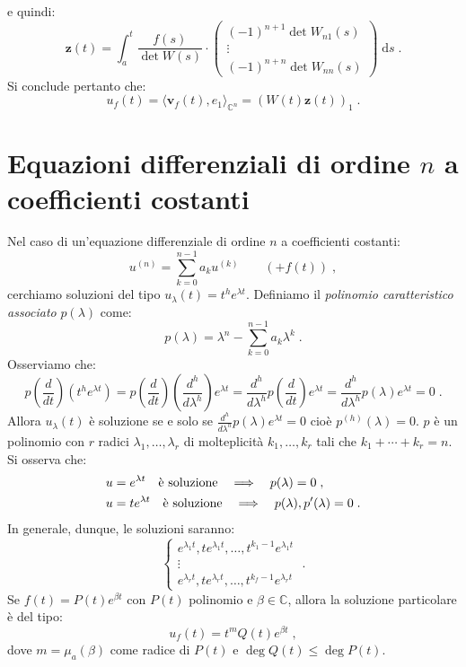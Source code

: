 \documentclass[a4paper,12pt]{report}
\theoremstyle{plain}
\theoremstyle{definition}
\theoremstyle{remark}
\newcommand{\diff}[1]{\mathrm{d}#1}
\numberwithin{equation}{section}
\begin{document}
e quindi:
\begin{equation}
\mathbf{z}(t)=\int_a^t{\frac{f(s)}{\det W(s)} \cdot \begin{pmatrix}
                                             (-1)^{n+1} \det W_{n1}(s) \\
\vdots \\
(-1)^{n+n} \det W_{nn}(s)
                                            \end{pmatrix}}\; \diff{s}\;.
\end{equation}
Si conclude pertanto che:
\begin{equation}
u_f(t)=\langle \mathbf{v}_f(t),e_1\rangle_{\mathbb{C}^n}=\left(W(t) \mathbf{z}(t)\right)_1\;.
\end{equation}
\section{Equazioni differenziali di ordine $n$ a coefficienti costanti}
Nel caso di un'equazione differenziale di ordine $n$ a coefficienti costanti:
\begin{equation}
u^{(n)}= \sum_{k=0}^{n-1} a_k u^{(k)} \qquad (+f(t))\;,
\end{equation}
cerchiamo soluzioni del tipo $u_{\lambda}(t)=t^h e^{\lambda t}$. Definiamo il \textit{polinomio caratteristico associato} $p(\lambda)$ come:
\begin{equation}
p(\lambda)=\lambda^n-\sum_{k=0}^{n-1}a_k \lambda^k\;.
\end{equation}
Osserviamo che:
\begin{equation}
p\left(\frac{d}{dt}\right)(t^h e^{\lambda t}) = p\left(\frac{d}{dt}\right)\left(\frac{d^h}{d\lambda^h}\right) e^{\lambda t} =
\frac{d^h}{d\lambda^h}p\left(\frac{d}{dt}\right) e^{\lambda t} = \frac{d^h}{d\lambda^h}p(\lambda)e^{\lambda t}=0\;.
\end{equation}
Allora $u_{\lambda}(t)$ è soluzione se e solo se $\frac{d^h}{d\lambda^h}p(\lambda)e^{\lambda t}=0$ cioè $p^{(h)}(\lambda)=0$. $p$ è un 
polinomio con $r$ radici $\lambda_1,\ldots,\lambda_r$ di molteplicità $k_1,\ldots,k_r$ tali che $k_1+\cdots+k_r=n$. Si osserva che:
\begin{align}
&u=e^{\lambda t}\quad \mbox{è soluzione}\quad \Longrightarrow\quad p(\lambda)=0\;, \notag \\
&u=te^{\lambda t}\quad \mbox{è soluzione} \quad \Longrightarrow\quad p(\lambda),p'(\lambda)=0\;.
\end{align}
In generale, dunque, le soluzioni saranno:
\begin{equation}
\begin{cases}
 e^{\lambda_1 t}, te^{\lambda_1 t},\ldots, t^{k_1-1}e^{\lambda_1 t} \\
 \vdots \\
 e^{\lambda_r t}, te^{\lambda_r t},\ldots, t^{k_f-1}e^{\lambda_r t}
\end{cases}\;.
\end{equation}
Se $f(t)=P(t)e^{\beta t}$ con $P(t)$ polinomio e $\beta \in \mathbb{C}$, allora la soluzione particolare è del tipo:
\begin{equation}
u_f(t)=t^m Q(t) e^{\beta t}\;,
\end{equation}
dove $m=\mu_a (\beta)$ come radice di $P(t)$ e $\deg Q(t) \le \deg P(t)$.
\end{document}
